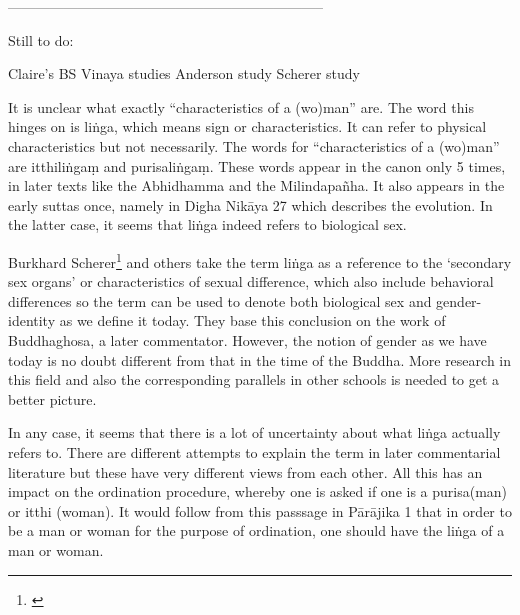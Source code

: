 --------------------------------------------------------------------


Still to do:


Claire's
BS Vinaya studies
Anderson study
Scherer study
















It is unclear what exactly “characteristics of a (wo)man” are. The word this hinges on is liṅga, which means sign or characteristics. It can refer to physical characteristics but not necessarily. The words for “characteristics of a (wo)man” are itthiliṅgaṃ and purisaliṅgaṃ. These words appear in the canon only 5 times, in later texts like the Abhidhamma and the Milindapañha. It also appears in the early suttas once, namely in Digha Nikāya 27 which describes the evolution. In the latter case, it seems that liṅga indeed refers to biological sex.


Burkhard Scherer\footnote{\cite{scherer}} and others take the term liṅga as a reference to the ‘secondary sex organs’ or characteristics of sexual difference, which also include behavioral differences so the term can be used to denote both biological sex and gender-identity as we define it today. They base this conclusion on the work of Buddhaghosa, a later commentator. However, the notion of gender as we have today is no doubt different from that in the time of the Buddha. More research in this field and also the corresponding parallels in other schools is needed to get a better picture.

In any case, it seems that there is a lot of uncertainty about what liṅga actually refers to. There are different attempts to explain the term in later commentarial literature but these have very different views from each other. All this has an impact on the ordination procedure, whereby one is asked if one is a purisa(man) or itthi (woman). It would follow from this passsage in Pārājika 1 that in order to be a man or woman for the purpose of ordination, one should have the liṅga of a man or woman.